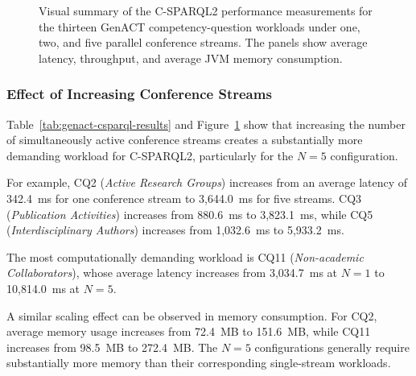 \begin{figure}[htbp]

\caption{Visual summary of the C-SPARQL2 performance measurements for the
thirteen GenACT competency-question workloads under one, two, and five
parallel conference streams. The panels show average latency, throughput,
and average JVM memory consumption.}
\label{fig:genact-csparql-performance}

\end{figure}


\subsubsection{Effect of Increasing Conference Streams}
\label{subsubsec:genact-scaling}

Table~\ref{tab:genact-csparql-results} and
Figure~\ref{fig:genact-csparql-performance} show that increasing the number of
simultaneously active conference streams creates a substantially more demanding
workload for C-SPARQL2, particularly for the $N=5$ configuration.

For example, CQ2 (\emph{Active Research Groups}) increases from an average
latency of 342.4~ms for one conference stream to 3,644.0~ms for five streams.
CQ3 (\emph{Publication Activities}) increases from 880.6~ms to 3,823.1~ms,
while CQ5 (\emph{Interdisciplinary Authors}) increases from 1,032.6~ms to
5,933.2~ms.

The most computationally demanding workload is CQ11
(\emph{Non-academic Collaborators}), whose average latency increases from
3,034.7~ms at $N=1$ to 10,814.0~ms at $N=5$.

A similar scaling effect can be observed in memory consumption. For CQ2,
average memory usage increases from 72.4~MB to 151.6~MB, while CQ11 increases
from 98.5~MB to 272.4~MB. The $N=5$ configurations generally require
substantially more memory than their corresponding single-stream workloads.

